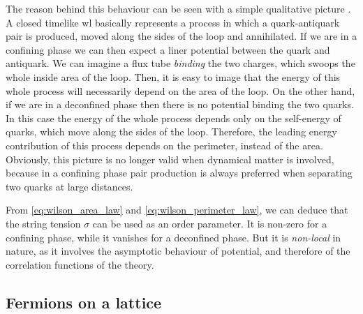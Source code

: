 The reason behind this behaviour can be seen with a simple qualitative picture \cite{creutz1985book, wilson1974confinement}.
A closed timelike \ac{wl} basically represents a process in which a quark-antiquark pair is produced, moved along the sides of the loop and annihilated.
If we are in a confining phase we can then expect a liner potential between the quark and antiquark.
We can imagine a flux tube \emph{binding} the two charges, which swoops the whole inside area of the loop.
Then, it is easy to image that the energy of this whole process will necessarily depend on the area of the loop.
On the other hand, if we are in a deconfined phase then there is no potential binding the two quarks.
In this case the energy of the whole process depends only on the self-energy of quarks, which move along the sides of the loop.
Therefore, the leading energy contribution of this process depends on the perimeter, instead of the area.
Obviously, this picture is no longer valid when dynamical matter is involved, because in a confining phase pair production is always preferred when separating two quarks at large distances.

From \eqref{eq:wilson_area_law} and \eqref{eq:wilson_perimeter_law}, we can deduce that the string tension $\sigma$ can be used as an order parameter.
It is non-zero for a confining phase, while it vanishes for a deconfined phase.
But it is \emph{non-local} in nature, as it involves the asymptotic behaviour of potential, and therefore of the correlation functions of the theory.

\begin{figure}[t]
\end{figure}



\subsection{Fermions on a lattice}
\label{sub:fermions_on_a_lattice}

